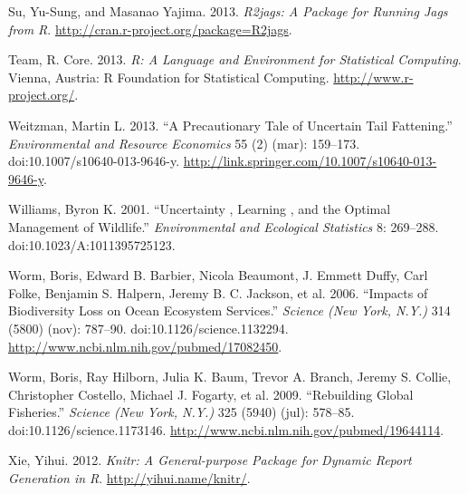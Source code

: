 \documentclass[author-year, review]{elsarticle} %
\begin{document}
Su, Yu-Sung, and Masanao Yajima. 2013. \emph{R2jags: A Package for
Running Jags from R}. \url{http://cran.r-project.org/package=R2jags}.

Team, R. Core. 2013. \emph{R: A Language and Environment for Statistical
Computing}. Vienna, Austria: R Foundation for Statistical Computing.
\url{http://www.r-project.org/}.

Weitzman, Martin L. 2013. ``A Precautionary Tale of Uncertain Tail
Fattening.'' \emph{Environmental and Resource Economics} 55 (2) (mar):
159--173. doi:10.1007/s10640-013-9646-y.
\url{http://link.springer.com/10.1007/s10640-013-9646-y}.

Williams, Byron K. 2001. ``Uncertainty , Learning , and the Optimal
Management of Wildlife.'' \emph{Environmental and Ecological Statistics}
8: 269--288. doi:10.1023/A:1011395725123.

Worm, Boris, Edward B. Barbier, Nicola Beaumont, J. Emmett Duffy, Carl
Folke, Benjamin S. Halpern, Jeremy B. C. Jackson, et al. 2006. ``Impacts
of Biodiversity Loss on Ocean Ecosystem Services.'' \emph{Science (New
York, N.Y.)} 314 (5800) (nov): 787--90. doi:10.1126/science.1132294.
\url{http://www.ncbi.nlm.nih.gov/pubmed/17082450}.

Worm, Boris, Ray Hilborn, Julia K. Baum, Trevor A. Branch, Jeremy S.
Collie, Christopher Costello, Michael J. Fogarty, et al. 2009.
``Rebuilding Global Fisheries.'' \emph{Science (New York, N.Y.)} 325
(5940) (jul): 578--85. doi:10.1126/science.1173146.
\url{http://www.ncbi.nlm.nih.gov/pubmed/19644114}.

Xie, Yihui. 2012. \emph{Knitr: A General-purpose Package for Dynamic
Report Generation in R}. \url{http://yihui.name/knitr/}.
\end{document}
